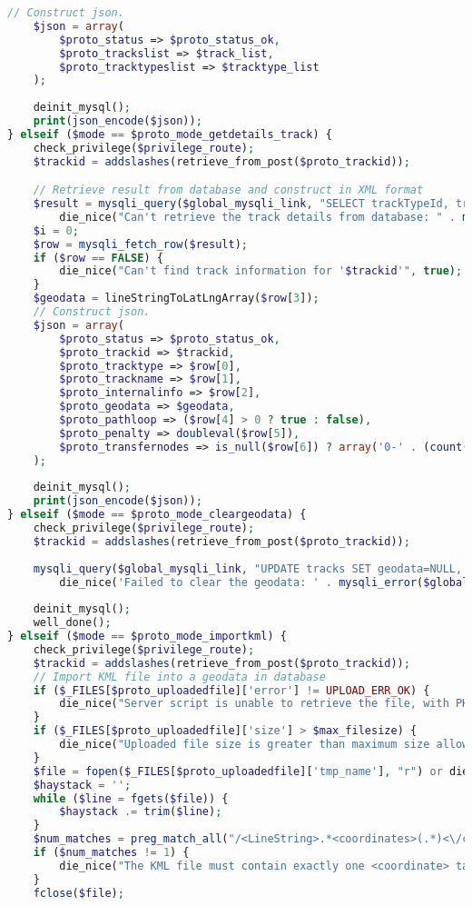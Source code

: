 \begin{lstlisting}[language=PHP,basicstyle=\tiny,caption=handle.php]
	// Construct json.
	$json = array(
		$proto_status => $proto_status_ok,
		$proto_trackslist => $track_list,
		$proto_tracktypeslist => $tracktype_list
	);
	
	deinit_mysql();
	print(json_encode($json));
} elseif ($mode == $proto_mode_getdetails_track) {
	check_privilege($privilege_route);
	$trackid = addslashes(retrieve_from_post($proto_trackid));

	// Retrieve result from database and construct in XML format
	$result = mysqli_query($global_mysqli_link, "SELECT trackTypeId, trackName, internalInfo, AsText(geodata), pathloop, penalty, transferNodes FROM tracks WHERE trackId='$trackid'") or
		die_nice("Can't retrieve the track details from database: " . mysqli_error($global_mysqli_link), true);
	$i = 0;
	$row = mysqli_fetch_row($result);
	if ($row == FALSE) {
		die_nice("Can't find track information for '$trackid'", true);
	}
	$geodata = lineStringToLatLngArray($row[3]);
	// Construct json.
	$json = array(
		$proto_status => $proto_status_ok,
		$proto_trackid => $trackid,
		$proto_tracktype => $row[0],
		$proto_trackname => $row[1],
		$proto_internalinfo => $row[2],
		$proto_geodata => $geodata,
		$proto_pathloop => ($row[4] > 0 ? true : false),
		$proto_penalty => doubleval($row[5]),
		$proto_transfernodes => is_null($row[6]) ? array('0-' . (count($geodata) - 1)) : split(',', $row[6]), 
	);
	
	deinit_mysql();
	print(json_encode($json));
} elseif ($mode == $proto_mode_cleargeodata) {
	check_privilege($privilege_route);
	$trackid = addslashes(retrieve_from_post($proto_trackid));
	
	mysqli_query($global_mysqli_link, "UPDATE tracks SET geodata=NULL, transferNodes=NULL WHERE trackId='$trackid'") or
		die_nice('Failed to clear the geodata: ' . mysqli_error($global_mysqli_link), true);
	
	deinit_mysql();
	well_done();
} elseif ($mode == $proto_mode_importkml) {
	check_privilege($privilege_route);
	$trackid = addslashes(retrieve_from_post($proto_trackid));
	// Import KML file into a geodata in database
	if ($_FILES[$proto_uploadedfile]['error'] != UPLOAD_ERR_OK) {
		die_nice("Server script is unable to retrieve the file, with PHP's UPLOAD_ERR_xxx code: " . $_FILES[$proto_uploadedfile]['error'], true);
	}
	if ($_FILES[$proto_uploadedfile]['size'] > $max_filesize) {
		die_nice("Uploaded file size is greater than maximum size allowed ($max_filesize)", true);
	}
	$file = fopen($_FILES[$proto_uploadedfile]['tmp_name'], "r") or die_nice('Unable to open uploaded file', true);
	$haystack = '';
	while ($line = fgets($file)) {
		$haystack .= trim($line);
	}
	$num_matches = preg_match_all("/<LineString>.*<coordinates>(.*)<\/coordinates>.*<\/LineString>/i", $haystack, $matches, PREG_PATTERN_ORDER);
	if ($num_matches != 1) {
		die_nice("The KML file must contain exactly one <coordinate> tag inside one <LineString> tag. But I found $num_matches occurences", true);
	}
	fclose($file);
	

\end{lstlisting}
